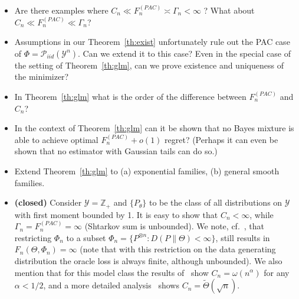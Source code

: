 \documentclass[12pt]{colt2021} %
\theoremstyle{remark}
\newcommand{\calP}{{\mathcal{P}}}
\newcommand{\calY}{{\mathcal{Y}}}
\renewcommand{\tilde}{\widetilde}
\begin{document}
\begin{itemize}
\item Are there examples where $C_n \ll F_n^{(PAC)} \asymp \Gamma_n < \infty$ ? What about $C_n \ll F_n^{(PAC)} \ll \Gamma_n$?
\item Assumptions in our Theorem~\ref{th:exist} unfortunately rule out the PAC case of $\Phi = \calP_{iid}(\calY^n)$. Can we extend it
to this case? Even in the special case of the setting of Theorem~\ref{th:glm}, can we prove existence and uniqueness 
of the minimizer?
\item In Theorem~\ref{th:glm} what is the order of the difference between $F_n^{(PAC)}$ and $C_n$?
\item In the context of Theorem~\ref{th:glm} can it be shown that no Bayes mixture is able to achieve optimal 
$F_n^{(PAC)} + o(1)$ regret? (Perhaps it can even be shown that no estimator with Gaussian tails can do so.)
\item Extend Theorem~\ref{th:glm} to (a) exponential families, (b) general smooth families.
\item \textbf{(closed)} Consider $\calY = \mathbb{Z}_+$ and $\{P_\theta\}$ to be the class of all distributions on $\calY$ with first
moment bounded by 1. It is easy to show that $C_n < \infty$, while $\Gamma_n = F_n^{(PAC)} = \infty$ (Shtarkov sum
is unbounded). 
We note, cf.~\cite{jia2021zplus}, that restricting $\Phi_n$ to a subset $\Phi_n = \{P^{\otimes n}:
D(P\|\Theta)<\infty\}$, still results in $F_n(\Theta,\Phi_n) = \infty$ (note that with this
restriction on the data generating distribution
the oracle loss is always finite, although unbounded). We also mention that for this model class
the results of~\cite{boucheron2008coding} show $C_n = \omega(n^\alpha)$ for any $\alpha < 1/2$,
and a more detailed analysis~\cite{jia2021zplus} shows $C_n = \tilde \Theta(\sqrt{n})$.


\end{itemize}
\end{document}

